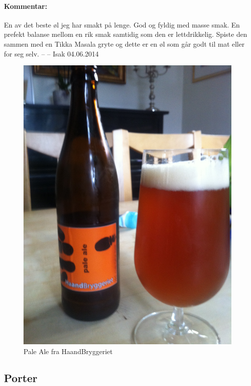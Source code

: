 \documentclass[12pt,a4paper,oneside,norsk]{article}
\begin{document}
\paragraph{Kommentar:} En av det beste øl jeg har smakt på lenge. God og fyldig med masse smak. En prefekt balanse mellom en rik smak samtidig som den er lettdrikkelig. Spiste den sammen med en Tikka Masala gryte og dette er en øl som går godt til mat eller for seg selv.
\newline
-- -- Isak 04.06.2014

\begin{figure} [H]
\centering
\includegraphics[scale=0.1, angle=270]{Bilder/Ol/palealehaand}
\caption{Pale Ale fra HaandBryggeriet}
\end{figure}

\newpage
\subsection{Porter}
\end{document}
